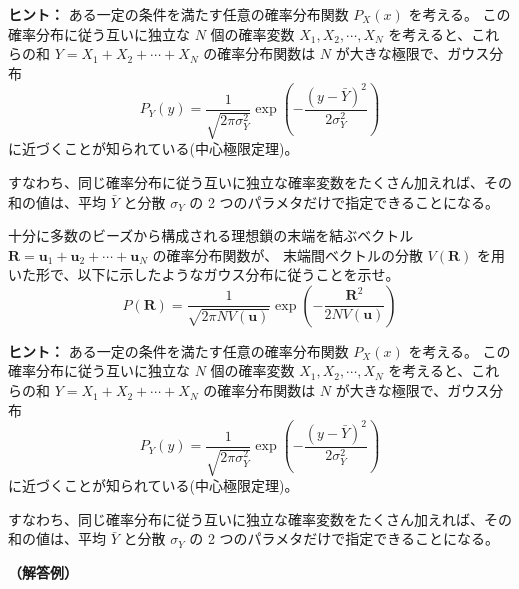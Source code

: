 \documentclass[uplatex,dvipdfmx,a4paper,11pt]{jsarticle}
\begin{document}
\begin{itembox}[l]{{\bf ヒント：}}
ある一定の条件を満たす任意の確率分布関数 $P_X(x)$ を考える。
この確率分布に従う互いに独立な $N$ 個の確率変数 $X_1, X_2, \cdots, X_N$ を考えると、これらの和 $Y = X_1+X_2+ \cdots+X_N$ の確率分布関数は $N$ が大きな極限で、ガウス分布
\begin{equation*}
P_Y(y) = \dfrac{1}{\sqrt{2 \pi \sigma_Y^2}} \exp \left(-\dfrac{(y-\bar{Y})^2}{2 \sigma_Y^2} \right)
\end{equation*}
に近づくことが知られている(中心極限定理)。

すなわち、同じ確率分布に従う互いに独立な確率変数をたくさん加えれば、その和の値は、平均 $\bar{Y}$ と分散 $\sigma_Y$ の 2 つのパラメタだけで指定できることになる。

\end{itembox}

\newpage

十分に多数のビーズから構成される理想鎖の末端を結ぶベクトル $\bm{R} = \bm{u}_1 + \bm{u}_2 + \cdots + \bm{u}_N$ の確率分布関数が、
末端間ベクトルの分散 $V(\bm{R})$ を用いた形で、以下に示したようなガウス分布に従うことを示せ。
\begin{equation*}
P(\bm{R}) = \dfrac{1}{\sqrt{2 \pi N V(\bm{u})}} \exp \left(-\dfrac{\bm{R}^2}{2 N V(\bm{u})} \right)
\end{equation*}


\begin{itembox}[l]{{\bf ヒント：}}
ある一定の条件を満たす任意の確率分布関数 $P_X(x)$ を考える。
この確率分布に従う互いに独立な $N$ 個の確率変数 $X_1, X_2, \cdots, X_N$ を考えると、これらの和 $Y = X_1+X_2+ \cdots+X_N$ の確率分布関数は $N$ が大きな極限で、ガウス分布
\begin{equation*}
P_Y(y) = \dfrac{1}{\sqrt{2 \pi \sigma_Y^2}} \exp \left(-\dfrac{(y-\bar{Y})^2}{2 \sigma_Y^2} \right)
\end{equation*}
に近づくことが知られている(中心極限定理)。

すなわち、同じ確率分布に従う互いに独立な確率変数をたくさん加えれば、その和の値は、平均 $\bar{Y}$ と分散 $\sigma_Y$ の 2 つのパラメタだけで指定できることになる。

\end{itembox}

\vspace{10pt}

{\bf （解答例）}

\vspace{10pt}
\end{document}
